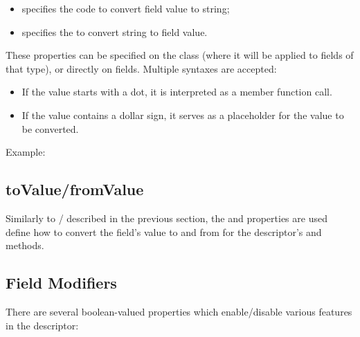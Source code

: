 \begin{itemize}
  \item {} specifies the code to convert field value to string;
  \item {} specifies the to convert string to field value.
\end{itemize}

These properties can be specified on the class (where it will be applied to
fields of that type), or directly on fields. Multiple syntaxes are accepted:

\begin{itemize}
  \item If the value starts with a dot, it is interpreted as a member function call.
  \item If the value contains a dollar sign, it serves as a placeholder for the
        value to be converted.
\end{itemize}

Example:



\subsection{toValue/fromValue}
\label{sec:msg-defs:descriptor-tovalue}

Similarly to / described in the previous
section, the  and  properties are used define
how to convert the field's value to and from  for the
descriptor's  and  methods.


\subsection{Field Modifiers}
\label{sec:msg-defs:descriptor-fieldmodifiers}

There are several boolean-valued properties which enable/disable various
features in the descriptor:

